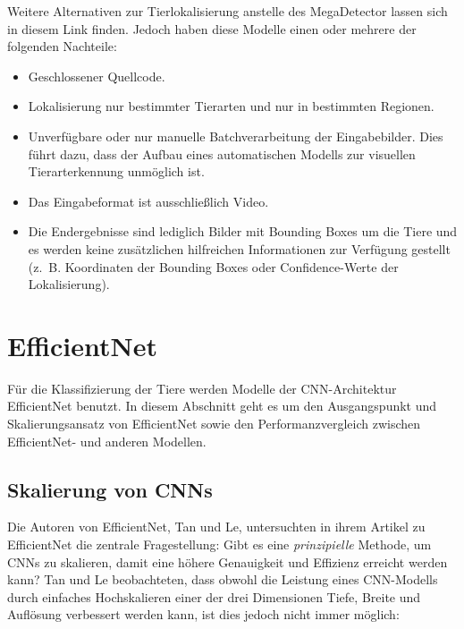 \begin{description}
\end{description}

Weitere Alternativen zur Tierlokalisierung anstelle des MegaDetector lassen sich in diesem Link finden. Jedoch haben diese Modelle einen oder mehrere der folgenden Nachteile:

\begin{itemize}
	\item Geschlossener Quellcode.
	
	\item Lokalisierung nur bestimmter Tierarten und nur in bestimmten Regionen.
	
	\item Unverfügbare oder nur manuelle Batchverarbeitung der Eingabebilder. Dies führt dazu, dass der Aufbau eines automatischen Modells zur visuellen Tierarterkennung unmöglich ist.
	
	\item Das Eingabeformat ist ausschließlich Video.
	
	\item Die Endergebnisse sind lediglich Bilder mit Bounding Boxes um die Tiere und es werden keine zusätzlichen hilfreichen Informationen zur Verfügung gestellt (z.~B. Koordinaten der Bounding Boxes oder Confidence-Werte der Lokalisierung).
\end{itemize}

\section{EfficientNet} \label{sec:efficientnet}

Für die Klassifizierung der Tiere werden Modelle der CNN-Architektur EfficientNet benutzt. In diesem Abschnitt geht es um den Ausgangspunkt und Skalierungsansatz von EfficientNet sowie den Performanzvergleich zwischen EfficientNet- und anderen Modellen.

\subsection{Skalierung von CNNs}

Die Autoren von EfficientNet, Tan und Le, untersuchten in ihrem Artikel zu EfficientNet die zentrale Fragestellung: Gibt es eine \textit{prinzipielle} Methode, um CNNs zu skalieren, damit eine höhere Genauigkeit und Effizienz erreicht werden kann? Tan und Le beobachteten, dass obwohl die Leistung eines CNN-Modells durch einfaches Hochskalieren einer der drei Dimensionen Tiefe, Breite und Auflösung verbessert werden kann, ist dies jedoch nicht immer möglich:

